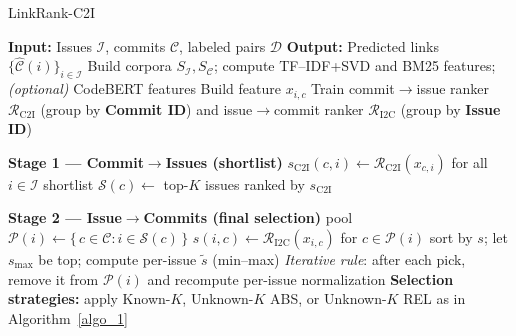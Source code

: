 \begin{algorithm}[htbp]
\caption{LinkRank-C2I}
\label{algo_2}
\begin{algorithmic}[1]
\STATE \textbf{Input:} Issues $\mathcal{I}$, commits $\mathcal{C}$, labeled pairs $\mathcal{D}$
\STATE \textbf{Output:} Predicted links $\{\widehat{\mathcal{C}}(i)\}_{i\in\mathcal{I}}$
\STATE Build corpora $S_{\mathcal{I}}, S_{\mathcal{C}}$; compute TF--IDF{+}SVD and BM25 features; \textit{(optional) }CodeBERT features
  \STATE Build feature $x_{i,c}$ 
\ENDFOR
\STATE Train commit$\rightarrow$issue ranker $\mathcal{R}_{\text{C2I}}$ (group by \textbf{Commit ID}) and issue$\rightarrow$commit ranker $\mathcal{R}_{\text{I2C}}$ (group by \textbf{Issue ID})

\vspace{0.25em}
\STATE \textbf{Stage 1 — Commit$\rightarrow$Issues (shortlist)}
  \STATE $s_{\text{C2I}}(c,i)\gets \mathcal{R}_{\text{C2I}}(x_{c,i})$ for all $i\in\mathcal{I}$
  \STATE shortlist $\mathcal{S}(c)\gets$ top-$K$ issues ranked by $s_{\text{C2I}}$
\ENDFOR

\vspace{0.25em}
\STATE \textbf{Stage 2 — Issue$\rightarrow$Commits (final selection)}
  \STATE pool $\mathcal{P}(i)\gets \{\,c\in\mathcal{C}: i\in\mathcal{S}(c)\,\}$
  \STATE $s(i,c)\gets \mathcal{R}_{\text{I2C}}(x_{i,c})$ for $c\in\mathcal{P}(i)$
  \STATE sort by $s$; let $s_{\max}$ be top; compute per-issue $\tilde{s}$ (min--max)
  \STATE \textit{Iterative rule}: after each pick, remove it from $\mathcal{P}(i)$ and recompute per-issue normalization
  \STATE \textbf{Selection strategies:} apply Known-$K$, Unknown-$K$ ABS, or Unknown-$K$ REL as in Algorithm~\ref{algo_1}
\ENDFOR
\end{algorithmic}
\end{algorithm}